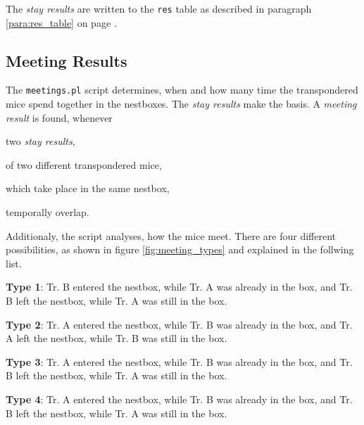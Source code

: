 The \textit{stay results} are written to the \lstinline|res| table as described in paragraph \ref{para:res_table} on page \pageref{para:res_table}.

\subsection{Meeting Results}
\label{subsec:meetingres}

The \lstinline|meetings.pl| script determines, when and how many time the transpondered mice spend together in the nestboxes. The \textit{stay results} make the basis. A \textit{meeting result} is found, whenever

\begin{mylist}
\item two \textit{stay results},
\item of two different transpondered mice,
\item which take place in the same nestbox,
\item temporally overlap.
\end{mylist}

Additionaly, the script analyses, how the mice meet. There are four different possibilities, as shown in figure \ref{fig:meeting_types} and explained in the follwing list.

\begin{mydesc}
\label{list:meeting_types}
\item \textbf{Type 1}: Tr. B entered the nestbox, while Tr. A was already in the box, and Tr. B left the nestbox, while Tr. A was still in the box. 
\item \textbf{Type 2}: Tr. A entered the nestbox, while Tr. B was already in the box, and Tr. A left the nestbox, while Tr. B was still in the box. 
\item \textbf{Type 3}: Tr. A entered the nestbox, while Tr. B was already in the box, and Tr. B left the nestbox, while Tr. A was still in the box. 
\item \textbf{Type 4}: Tr. A entered the nestbox, while Tr. B was already in the box, and Tr. B left the nestbox, while Tr. A was still in the box. 
\end{mydesc}

